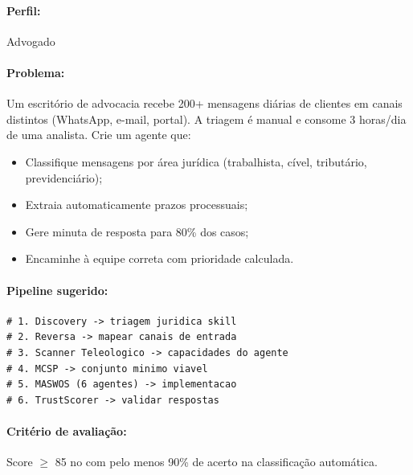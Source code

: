 \begin{exercicio}
\label{ex:juridico}

\paragraph{Perfil:} Advogado \hfill \nivelintermediario

\paragraph{Problema:} Um escritório de advocacia recebe 200+
mensagens diárias de clientes em canais distintos (WhatsApp,
e-mail, portal). A triagem é manual e consome 3 horas/dia de
uma analista. Crie um agente que:

\begin{itemize}
    \item Classifique mensagens por área jurídica (trabalhista,
          cível, tributário, previdenciário);
    \item Extraia automaticamente prazos processuais;
    \item Gere minuta de resposta para 80\% dos casos;
    \item Encaminhe à equipe correta com prioridade calculada.
\end{itemize}

\paragraph{Pipeline sugerido:}
\begin{lstlisting}[style=bashstyle, basicstyle=\ttfamily\small]
# 1. Discovery -> triagem juridica skill
# 2. Reversa -> mapear canais de entrada
# 3. Scanner Teleologico -> capacidades do agente
# 4. MCSP -> conjunto minimo viavel
# 5. MASWOS (6 agentes) -> implementacao
# 6. TrustScorer -> validar respostas
\end{lstlisting}

\paragraph{Critério de avaliação:} Score $\ge$ 85 no
 com pelo menos 90\% de acerto na
classificação automática.

\end{exercicio}

